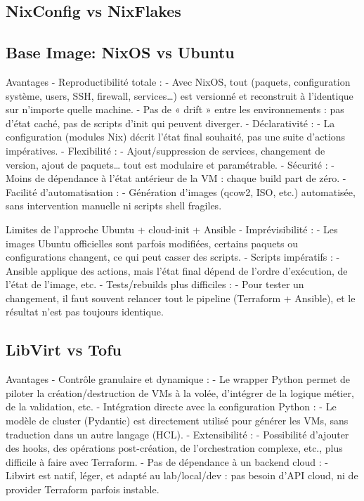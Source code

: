\subsection{NixConfig vs NixFlakes}

\subsection{Base Image: NixOS vs Ubuntu}

Avantages
- Reproductibilité totale :
- Avec NixOS, tout (paquets, configuration système, users, SSH, firewall, services…) est versionné et reconstruit à l'identique sur n'importe quelle machine.
- Pas de « drift » entre les environnements : pas d'état caché, pas de scripts d'init qui peuvent diverger.
- Déclarativité :
- La configuration (modules Nix) décrit l'état final souhaité, pas une suite d'actions impératives.
- Flexibilité :
- Ajout/suppression de services, changement de version, ajout de paquets… tout est modulaire et paramétrable.
- Sécurité :
- Moins de dépendance à l'état antérieur de la VM : chaque build part de zéro.
- Facilité d'automatisation :
- Génération d'images (qcow2, ISO, etc.) automatisée, sans intervention manuelle ni scripts shell fragiles.

Limites de l'approche Ubuntu + cloud-init + Ansible
- Imprévisibilité :
- Les images Ubuntu officielles sont parfois modifiées, certains paquets ou configurations changent, ce qui peut casser des scripts.
- Scripts impératifs :
- Ansible applique des actions, mais l'état final dépend de l'ordre d'exécution, de l'état de l'image, etc.
- Tests/rebuilds plus difficiles :
- Pour tester un changement, il faut souvent relancer tout le pipeline (Terraform + Ansible), et le résultat n'est pas toujours identique.


\subsection{LibVirt vs Tofu}

Avantages
- Contrôle granulaire et dynamique :
- Le wrapper Python permet de piloter la création/destruction de VMs à la volée, d'intégrer de la logique métier, de la validation, etc.
- Intégration directe avec la configuration Python :
- Le modèle de cluster (Pydantic) est directement utilisé pour générer les VMs, sans traduction dans un autre langage (HCL).
- Extensibilité :
- Possibilité d'ajouter des hooks, des opérations post-création, de l'orchestration complexe, etc., plus difficile à faire avec Terraform.
- Pas de dépendance à un backend cloud :
- Libvirt est natif, léger, et adapté au lab/local/dev : pas besoin d'API cloud, ni de provider Terraform parfois instable.

